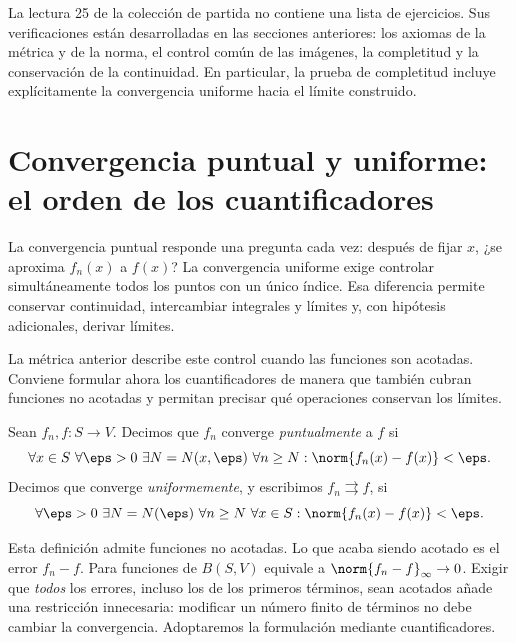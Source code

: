 \begin{observacion}
La lectura 25 de la colección de partida no contiene una lista de ejercicios. Sus verificaciones están desarrolladas en las secciones anteriores: los axiomas de la métrica y de la norma, el control común de las imágenes, la completitud y la conservación de la continuidad. En particular, la prueba de completitud incluye explícitamente la convergencia uniforme hacia el límite construido.
\end{observacion}

\section{Convergencia puntual y uniforme: el orden de los cuantificadores}
\label{lectura:26}
La convergencia puntual responde una pregunta cada vez: después de fijar $x$, ¿se aproxima $f_n(x)$ a $f(x)$? La convergencia uniforme exige controlar simultáneamente todos los puntos con un único índice. Esa diferencia permite conservar continuidad, intercambiar integrales y límites y, con hipótesis adicionales, derivar límites.

La métrica anterior describe este control cuando las funciones son acotadas. Conviene formular ahora los cuantificadores de manera que también cubran funciones no acotadas y permitan precisar qué operaciones conservan los límites.

\begin{definicion}
Sean $f_n,f:S\to V$. Decimos que $f_n$ converge \emph{puntualmente} a $f$ si
\[
 \forall x\in S\ \forall\eps>0\ \exists N=N(x,\eps)\ \forall n\ge N:
 \norm{f_n(x)-f(x)}<\eps.
\]
Decimos que converge \emph{uniformemente}, y escribimos $f_n\rightrightarrows f$, si
\[
 \forall\eps>0\ \exists N=N(\eps)\ \forall n\ge N\ \forall x\in S:
 \norm{f_n(x)-f(x)}<\eps.
\]
\end{definicion}

Esta definición admite funciones no acotadas. Lo que acaba siendo acotado es el error $f_n-f$. Para funciones de $B(S,V)$ equivale a $\norm{f_n-f}_\infty\to0$. Exigir que \emph{todos} los errores, incluso los de los primeros términos, sean acotados añade una restricción innecesaria: modificar un número finito de términos no debe cambiar la convergencia. Adoptaremos la formulación mediante cuantificadores.

